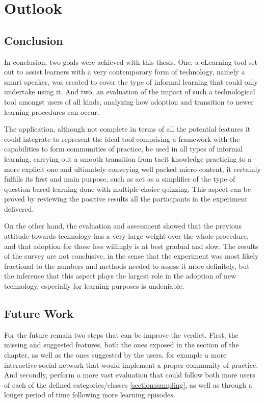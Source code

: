 \chapter{Outlook}
\label{cha:outlook}

\section{Conclusion}

In conclusion, two goals were achieved with this thesis. One, a eLearning tool set out to assist learners
with a very contemporary form of technology, namely a smart speaker, was created to cover the type of
informal learning that could only undertake using it. And two, an evaluation of the impact of such a 
technological tool amongst users of all kinds, analyzing how adoption and transition to newer learning
procedures can occur.

The application, although not complete in terms of all the potential features it could integrate to 
represent the ideal tool comprising a framework with the capabilities to form communities of practice, 
be used in all types of informal learning, carrying out a smooth transition from tacit knowledge practicing
to a more explicit one and ultimately conveying well packed micro content, it certainly fulfills its
first and main purpose, such as act as a simplifier of the type of question-based learning done
with multiple choice quizzing. This aspect can be proved by reviewing the positive results all the
participants in the experiment delivered.

On the other hand, the evaluation and assessment showed that the previous attitude towards technology
has a very large weight over the whole procedure, and that adoption for those less willingly is at best
gradual and slow. The results of the survey are not conclusive, in the sense that the experiment was
most likely fractional to the numbers and methods needed to assess it more definitely, but the inference
that this aspect plays the largest role in the adoption of new technology, especially for learning purposes
is undeniable.



\section{Future Work}
For the future remain two steps that can be improve the verdict. First, the missing and suggested features, 
both the ones exposed in the  section of the  chapter,
as well as the ones suggested by the users, for example a more interactive social network that would
implement a proper community of practice. And secondly, perform a more vast evaluation that could follow
both more users of each of the defined categories/classes \ref{section:sampling}, as well as through a longer
period of time following more learning episodes. 
